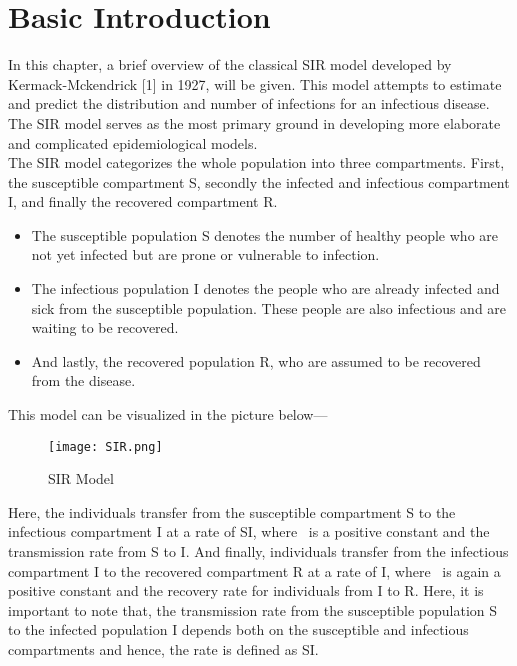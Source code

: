 \section{Basic Introduction}

In this chapter, a brief overview of the classical SIR model developed by Kermack-Mckendrick [1] in 1927, will be given. This model attempts to estimate and predict the distribution and number of infections for an infectious disease. The SIR model serves as the most primary ground in developing more elaborate and complicated epidemiological models. \\

The SIR model categorizes the whole population into three compartments. First, the susceptible compartment S, secondly the infected and infectious compartment I, and finally the recovered compartment R. \\

\begin{itemize}
	\item The susceptible population S denotes the number of healthy people who are not yet infected but are prone or vulnerable to infection.  \\
	
	\item The infectious population I denotes the people who are already infected and sick from the susceptible population. These people are also infectious and are waiting to be recovered.  \\
	
	\item And lastly, the recovered population R, who are assumed to be recovered from the disease.
\end{itemize}

This model can be visualized in the picture below--- \\

\begin{figure}[H]
\centering
\texttt{[image: SIR.png]}
\caption{SIR Model}
\label{fig:SIR Model}
\end{figure}

Here, the individuals transfer from the susceptible compartment S to the infectious compartment I at a rate of \textbeta SI, where \textbeta \ is a positive constant and the transmission rate from S to I. And finally, individuals transfer from the infectious compartment I to the recovered compartment R at a rate of \textalpha I, where \textalpha \ is again a positive constant and the recovery rate for individuals from I to R. Here, it is important to note that, the transmission rate from the susceptible population S to the infected population I depends both on the susceptible and infectious compartments and hence, the rate is defined as \textbeta SI. \\

